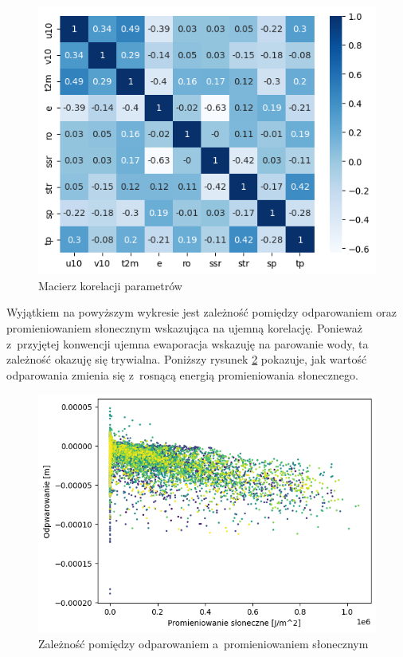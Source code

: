 \begin{figure}[H]
    \centering
    \includegraphics[width=\textwidth]{images/correlation_matrix.png}
    \caption[Macierz korelacji parametrów]{Macierz korelacji parametrów}
    \label{matrix}
\end{figure}

Wyjątkiem na powyższym wykresie jest zależność pomiędzy odparowaniem oraz promieniowaniem 
słonecznym wskazująca na ujemną korelację. Ponieważ z~przyjętej konwencji ujemna ewaporacja
wskazuję na parowanie wody, ta zależność okazuję się trywialna. Poniższy rysunek
\ref{e-ssr} pokazuje, jak wartość odparowania zmienia się z~rosnącą energią
promieniowania słonecznego.

\begin{figure}[H]
    \centering
    \includegraphics[width=\textwidth]{images/e-ssr.png}
    \caption[Korelacja odparowania i promieniowania słonecznego]{Zależność pomiędzy odparowaniem a~promieniowaniem słonecznym}
    \label{e-ssr}
\end{figure}

